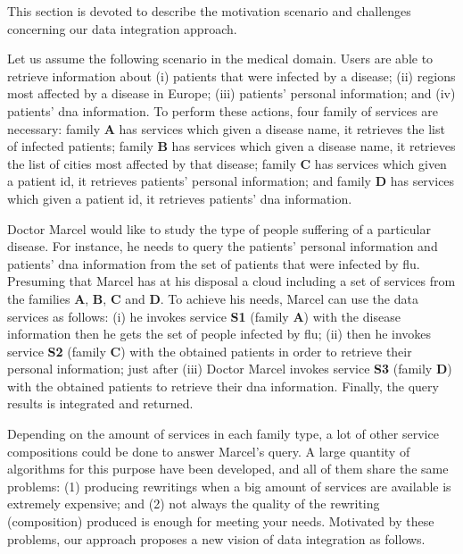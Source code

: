 This section is devoted to describe the motivation scenario and challenges
concerning our data integration approach.
%

Let us assume the following scenario in the medical domain. 
Users are able to retrieve information about (i) patients that were infected by a disease; 
(ii) regions most affected by a disease in Europe; 
(iii) patients' personal information; and 
(iv) patients' dna information.
To perform these actions, four family of services are necessary: family
\textbf{A} has services which given a disease name, it retrieves the list
of infected patients; family \textbf{B} has services which given a disease name,
it retrieves the list of cities most affected by that disease; family \textbf{C}
has services which given a patient id, it retrieves patients' personal
information; and family \textbf{D} has services which given a patient id, it
retrieves patients' dna information. 

Doctor Marcel would like to study the type of people suffering of a
particular disease. For instance, he needs to query the patients' personal
information and patients' dna information from the set of patients that were
infected by flu. Presuming that Marcel has at his disposal a cloud
including a set of services from the families \textbf{A}, \textbf{B}, \textbf{C} and \textbf{D}. To achieve
his needs, Marcel can use the data services as follows: (i) he invokes service
\textbf{S1} (family \textbf{A}) with the disease information then he gets the
set of people infected by flu; (ii) then he invokes service \textbf{S2} (family
\textbf{C}) with the obtained patients in order to retrieve their personal
information; just after (iii) Doctor Marcel invokes service \textbf{S3} (family
\textbf{D}) with the obtained patients to retrieve their dna information.
Finally, the query results is integrated and returned.

Depending on the amount of services in each family type, a lot of other service
compositions could be done to answer Marcel's query. A large quantity of
algorithms for this purpose have been developed, and all of them share the same
problems: (1) producing rewritings when a big amount of services are available
is extremely expensive; and (2) not always the quality of the rewriting (composition) produced is enough for meeting your needs.
Motivated by these problems, our approach proposes a new vision of data
integration as follows.

